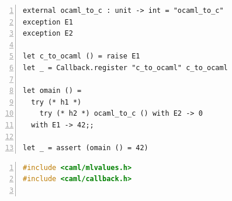 \documentclass[sigplan,10pt,review,anonymous]{acmart}\settopmatter{printfolios=true,printccs=false,printacmref=false}
\begin{document}
\begin{figure}
\begin{minipage}{0.59\linewidth}
	\begin{minipage}{\linewidth}
		\begin{lstlisting}[numbers=left]
external ocaml_to_c : unit -> int = "ocaml_to_c"
exception E1
exception E2

let c_to_ocaml () = raise E1
let _ = Callback.register "c_to_ocaml" c_to_ocaml

let omain () =
  try (* h1 *)
    try (* h2 *) ocaml_to_c () with E2 -> 0
  with E1 -> 42;;

let _ = assert (omain () = 42)
		\end{lstlisting}
    \label{code:meander_ml}
	\end{minipage}
	\begin{minipage}{\linewidth}
		\begin{lstlisting}[language=c,numbers=left]
#include <caml/mlvalues.h>
#include <caml/callback.h>


\end{lstlisting}
\end{minipage}
\end{minipage}
\end{figure}
\end{document}
